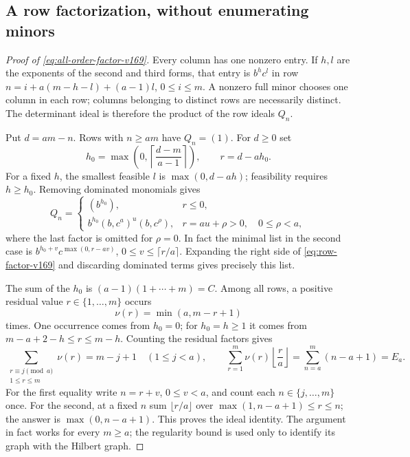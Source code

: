 \documentclass[11pt,reqno]{amsart}
\numberwithin{equation}{section}
\theoremstyle{definition}\newtheorem{definition}[theorem]{Definition}
\theoremstyle{remark}\newtheorem{remark}[theorem]{Remark}
\begin{document}
\subsection{A row factorization, without enumerating minors}
\begin{proof}[Proof of \eqref{eq:all-order-factor-v169}]
Every column has one nonzero entry. If $h,l$ are the exponents of the
second and third forms, that entry is $b^hc^l$ in row
$n=i+a(m-h-l)+(a-1)l$, $0\leq i\leq m$. A nonzero full minor chooses
one column in each row; columns belonging to distinct rows are
necessarily distinct. The determinant ideal is therefore the product
of the row ideals $Q_n$.

Put $d=am-n$. Rows with $n\geq am$ have $Q_n=(1)$. For $d\geq0$ set
\[
 h_0=\max\left(0,\left\lceil\frac{d-m}{a-1}\right\rceil\right),
 \qquad r=d-ah_0.
\]
For a fixed $h$, the smallest feasible $l$ is $\max(0,d-ah)$;
feasibility requires $h\geq h_0$. Removing dominated monomials gives
\begin{equation}\label{eq:row-factor-v169}
 Q_n=
 \begin{cases}
 (b^{h_0}),&r\leq0,\\
 b^{h_0}(b,c^a)^u(b,c^\rho),&r=au+\rho>0,\quad0\leq\rho<a,
 \end{cases}
\end{equation}
where the last factor is omitted for $\rho=0$. In fact the minimal
list in the second case is
$b^{h_0+v}c^{\max(0,r-av)}$, $0\leq v\leq\lceil r/a\rceil$.
Expanding the right side of \eqref{eq:row-factor-v169} and discarding
dominated terms gives precisely this list.

The sum of the $h_0$ is
$(a-1)(1+\cdots+m)=C$. Among all rows, a positive residual value
$r\in\{1,\ldots,m\}$ occurs
\[
 \nu(r)=\min(a,m-r+1)
\]
times. One occurrence comes from $h_0=0$; for $h_0=h\geq1$ it comes
from $m-a+2-h\leq r\leq m-h$. Counting the residual factors gives
\[
 \sum_{\substack{r\equiv j\pmod a\\1\leq r\leq m}}\nu(r)=m-j+1
 \quad(1\leq j<a),
 \qquad
 \sum_{r=1}^m\nu(r)\left\lfloor\frac ra\right\rfloor
       =\sum_{n=a}^m(n-a+1)=E_a.
\]
For the first equality write $n=r+v$, $0\leq v<a$, and count each
$n\in\{j,\ldots,m\}$ once. For the second, at a fixed $n$ sum
$\lfloor r/a\rfloor$ over
$\max(1,n-a+1)\leq r\leq n$; the answer is $\max(0,n-a+1)$.
This proves the ideal identity. The argument in fact works for every
$m\geq a$; the regularity bound is used only to identify its graph
with the Hilbert graph.
\end{proof}
\end{document}
